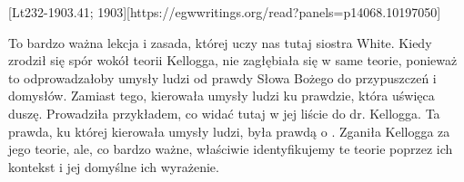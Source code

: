 [Lt232-1903.41; 1903][https://egwwritings.org/read?panels=p14068.10197050]

To bardzo ważna lekcja i zasada, której uczy nas tutaj siostra White. Kiedy zrodził się spór wokół teorii Kellogga, nie zagłębiała się w same teorie, ponieważ to odprowadzałoby umysły ludzi od prawdy Słowa Bożego do przypuszczeń i domysłów. Zamiast tego, kierowała umysły ludzi ku prawdzie, która uświęca duszę. Prowadziła przykładem, co widać tutaj w jej liście do dr. Kellogga. Ta prawda, ku której kierowała umysły ludzi, była prawdą o . Zganiła Kellogga za jego teorie, ale, co bardzo ważne, właściwie identyfikujemy te teorie poprzez ich kontekst i jej domyślne ich wyrażenie.

